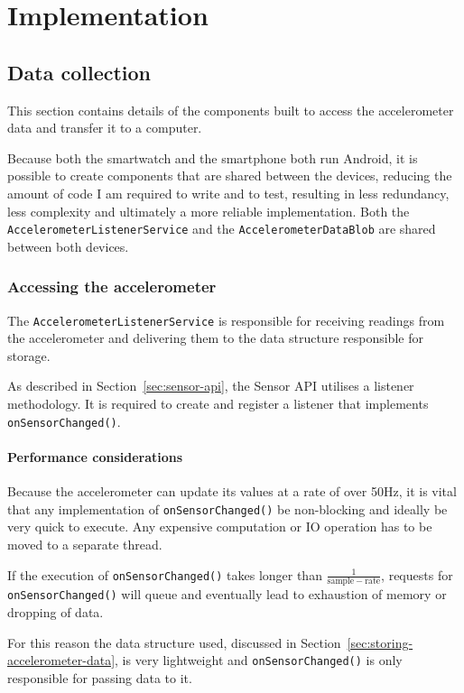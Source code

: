 \chapter{Implementation}
  \section{Data collection}
    This section contains details of the components built to access the accelerometer data and transfer it to a computer.
    
    Because both the smartwatch and the smartphone both run Android, it is possible to create components that are shared between the devices, reducing the amount of code I am required to write and to test, resulting in less redundancy, less complexity and ultimately a more reliable implementation. Both the \texttt{AccelerometerListenerService} and the \texttt{AccelerometerDataBlob} are shared between both devices.
    
    \subsection{Accessing the accelerometer}
      The \texttt{AccelerometerListenerService} is responsible for receiving readings from the accelerometer and delivering them to the data structure responsible for storage.
      
      As described in Section~\ref{sec:sensor-api}, the Sensor API utilises a listener methodology. It is required to create and register a listener that implements \texttt{onSensorChanged()}. 
      
      \subsubsection{Performance considerations}
        Because the accelerometer can update its values at a rate of over 50\si{Hz}, it is vital that any implementation of \texttt{onSensorChanged()} be non-blocking and ideally be very quick to execute. Any expensive computation or IO operation has to be moved to a separate thread.
        
        If the execution of \texttt{onSensorChanged()} takes longer than $\frac{1}{\mathrm{sample-rate}}$, requests for \texttt{onSensorChanged()} will queue and eventually lead to exhaustion of memory or dropping of data.
        
        For this reason the data structure used, discussed in Section~\ref{sec:storing-accelerometer-data}, is very lightweight and \texttt{onSensorChanged()} is only responsible for passing data to it.
      
